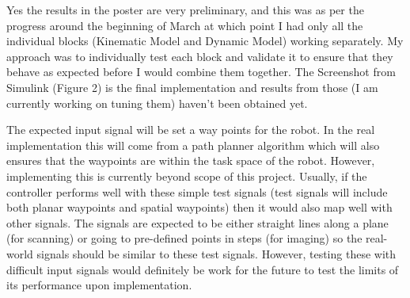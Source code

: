 \documentclass[a4paper,12pt]{article}
\begin{document}
Yes the results in the poster are very preliminary, and this was as per the progress around the beginning of March at which point I had only all the individual blocks (Kinematic Model and Dynamic Model) working separately. My approach was to individually test each block and validate it to ensure that they behave as expected before I would combine them together. The Screenshot from Simulink (Figure 2) is the final implementation and results from those (I am currently working on tuning them) haven’t been obtained yet. 

The expected input signal will be set a way points for the robot. In the real implementation this will come from a path planner algorithm which will also ensures that the waypoints are within the task space of the robot. However, implementing this is currently beyond scope of this project. Usually, if the controller performs well with these simple test signals (test signals will include both planar waypoints and spatial waypoints) then it would also map well with other signals. The signals are expected to be either straight lines along a plane (for scanning) or going to pre-defined points in steps (for imaging) so the real-world signals should be similar to these test signals. However, testing these with difficult input signals would definitely be work for the future to test the limits of its performance upon implementation.

\pagebreak


\end{document}
